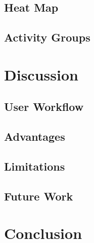 \documentclass[12pt,a4paper]{article}
\begin{document}
\subsection{Heat Map}


\subsection{Activity Groups}


\section{Discussion}


\subsection{User Workflow}


\subsection{Advantages}


\subsection{Limitations}


\subsection{Future Work}


\section{Conclusion}

\end{document}
